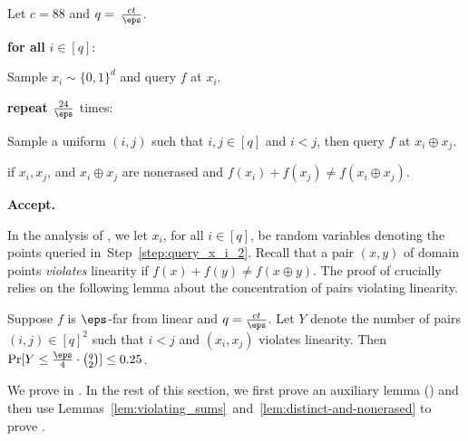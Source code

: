 \documentclass{toc}
\begin{document}
\begin{algorithm} %
	\caption{An Online-Erasure-Resilient Linearity Tester}
	\begin{algorithmic}[1]
		
		\State Let $c = 88$ and $q = \:\frac{ct}{\eps}$. 
		
		\State\textbf{for all} {$i \in [q]$}:\label{step:loop_query_x_i_2}

		\State  \indent Sample $x_i \sim \{0,1\}^d$ and query $f$ at $x_i$. \label{step:query_x_i_2}
		
		\State\textbf{repeat} $\frac{24}{\eps}$ times:\label{step:query_sum}
		
		\State  \indent Sample a uniform $(i, j)$ such that $i,j\in[q]$ and $i <j$, then  query $f$ at $x_i \oplus x_j$.\label{step:sample-ij}
		
		\State  {} if $x_i, x_j$, and $x_i\oplus x_j$ are nonerased and $f(x_i) + f(x_j) \neq f(x_i\oplus x_j)$.\label{step:check_I}
		
	
		\State \textbf{Accept.}
	\end{algorithmic}
	\label{alg:linearity}
\end{algorithm}

In the analysis of , we let $x_i$, for all $i \in [q]$, be random variables denoting the points queried in~Step~\ref{step:query_x_i_2}. 
Recall that a pair $(x, y)$ of domain points  \emph{violates} linearity if $f(x) + f(y) \neq f(x \oplus y)$.
The proof of  crucially relies on the following lemma about the concentration of pairs violating linearity. %

\begin{lemma}\label{lem:violating_sums}
Suppose $f$ is $\eps$-far from linear and $q = \frac{ct}{\eps}$. Let $Y$ denote the number of pairs $(i,j) \in [q]^2$ such that $i < j$ and $(x_i,x_j)$ violates linearity. Then $\Pr[Y \leq \frac{\eps}{4}\cdot \binom{q}{2}]\leq 0.25$.  %
\end{lemma}



We prove  in . In the rest of this section, we first prove an auxiliary lemma () and then use Lemmas~\ref{lem:violating_sums}~and~\ref{lem:distinct-and-nonerased} to prove .
\end{document}
